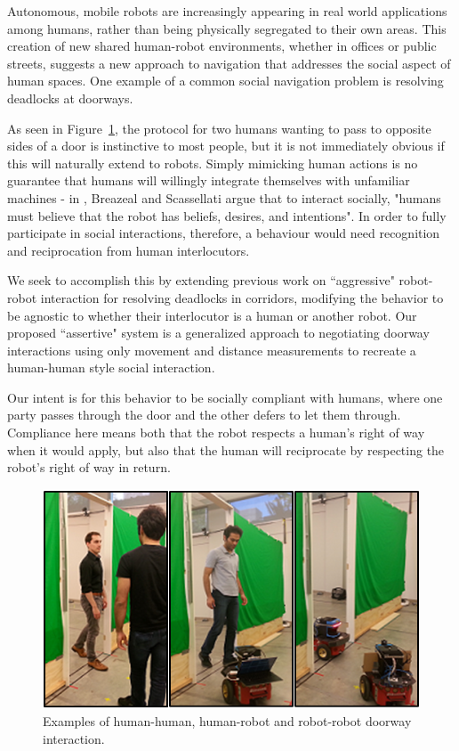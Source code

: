 \documentclass[letterpaper, 10 pt, conference]{ieeeconf}  %
\begin{document}
Autonomous, mobile robots are increasingly appearing in real world applications among humans, rather than being physically segregated to their own areas. This creation of new shared human-robot environments, whether in offices or public streets, suggests a new approach to navigation that addresses the social aspect of human spaces. One example of a common social navigation problem is resolving deadlocks at doorways. 

As seen in Figure~\ref{fig:Triptych}, the protocol for two humans wanting to pass to opposite sides of a door is instinctive to most people, but it is not immediately obvious if this will naturally extend to robots. Simply mimicking human actions is no guarantee that humans will willingly integrate themselves with unfamiliar machines - in \cite{c0}, Breazeal and Scassellati argue that to interact socially, "humans must believe that the robot has beliefs, desires, and intentions". In order to fully participate in social interactions, therefore, a behaviour would need recognition and reciprocation from human interlocutors.

We seek to accomplish this by extending previous work on ``aggressive" robot-robot interaction\cite{c1} for resolving deadlocks in corridors, modifying the behavior to be agnostic to whether their interlocutor is a human or another robot. Our proposed ``assertive" system is a generalized approach to negotiating doorway interactions using only movement and distance measurements to recreate a human-human style social interaction.

Our intent is for this behavior to be socially compliant with humans, where one party passes through the door and the other defers to let them through. Compliance here means both that the robot respects a human's right of way when it would apply, but also that the human will reciprocate by respecting the robot's right of way in return. 

   \begin{figure}
      \centering
      \includegraphics[scale=0.5]{Triptych.png}
      \caption{Examples of human-human, human-robot and robot-robot doorway interaction.}
      \label{fig:Triptych}
   \end{figure}
\end{document}
